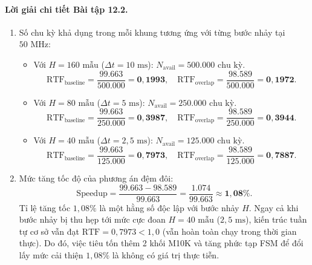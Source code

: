 \paragraph{Lời giải chi tiết Bài tập 12.2.}
\begin{enumerate}[label=(\alph*)]
    \item Số chu kỳ khả dụng trong mỗi khung tương ứng với từng bước nhảy tại $50\text{ MHz}$:
    \begin{itemize}
        \item Với $H = 160\text{ mẫu}$ ($\Delta t = 10\text{ ms}$): $N_{\text{avail}} = 500.000\text{ chu kỳ}$.
        \begin{equation}
            \text{RTF}_{\text{baseline}} = \frac{99.663}{500.000} = \mathbf{0{,}1993}, \quad \text{RTF}_{\text{overlap}} = \frac{98.589}{500.000} = \mathbf{0{,}1972}.
        \end{equation}
        \item Với $H = 80\text{ mẫu}$ ($\Delta t = 5\text{ ms}$): $N_{\text{avail}} = 250.000\text{ chu kỳ}$.
        \begin{equation}
            \text{RTF}_{\text{baseline}} = \frac{99.663}{250.000} = \mathbf{0{,}3987}, \quad \text{RTF}_{\text{overlap}} = \frac{98.589}{250.000} = \mathbf{0{,}3944}.
        \end{equation}
        \item Với $H = 40\text{ mẫu}$ ($\Delta t = 2{,}5\text{ ms}$): $N_{\text{avail}} = 125.000\text{ chu kỳ}$.
        \begin{equation}
            \text{RTF}_{\text{baseline}} = \frac{99.663}{125.000} = \mathbf{0{,}7973}, \quad \text{RTF}_{\text{overlap}} = \frac{98.589}{125.000} = \mathbf{0{,}7887}.
        \end{equation}
    \end{itemize}

    \item Mức tăng tốc độ của phương án đệm đôi:
    \begin{equation}
        \text{Speedup} = \frac{99.663 - 98.589}{99.663} = \frac{1.074}{99.663} \approx \mathbf{1{,}08\%}.
    \end{equation}
    Tỉ lệ tăng tốc $1{,}08\%$ là một hằng số độc lập với bước nhảy $H$. Ngay cả khi bước nhảy bị thu hẹp tới mức cực đoan $H = 40\text{ mẫu}$ ($2{,}5\text{ ms}$), kiến trúc tuần tự cơ sở vẫn đạt $\text{RTF} = 0{,}7973 < 1{,}0$ (vẫn hoàn toàn chạy trong thời gian thực).
    Do đó, việc tiêu tốn thêm 2 khối M10K và tăng phức tạp FSM để đổi lấy mức cải thiện $1{,}08\%$ là không có giá trị thực tiễn.
\end{enumerate}

